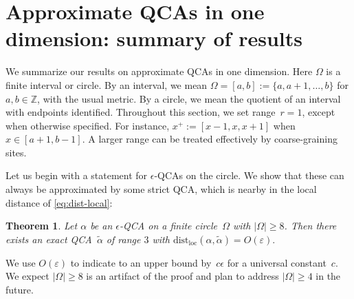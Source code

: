 \documentclass[11pt,reqno]{amsart}
\newtheorem{theorem}{Theorem}[section]
\theoremstyle{definition}
\theoremstyle{remark}
\numberwithin{equation}{section}
\DeclareMathOperator{\id}{id}
\newcommand{\eps}{\varepsilon}
\newcommand{\cA}{\mathcal A}
\newcommand{\distloc}{\mathrm{dist}_\mathrm{loc}}
\begin{document}

\section{Approximate QCAs in one dimension: summary of results}\label{sec:summary of results}
We summarize our results on approximate QCAs in one dimension.
Here $\Omega$ is a finite interval or circle.
By an interval, we mean $\Omega = [a,b] := \{a,a+1,\ldots,b\}$ for $a,b \in \mathbb{Z}$, with the usual metric.
By a circle, we mean the quotient of an interval with endpoints identified.
Throughout this section, we set range~$r=1$, except when otherwise specified.
For instance, $x^+ := [x-1,x,x+1]$ when $x \in [a+1,b-1]$.
A larger range can be treated effectively by coarse-graining sites.

Let us begin with a statement for $\epsilon$-QCAs on the circle.
We show that these can always be approximated by some strict QCA, which is nearby in the local distance of \cref{eq:dist-local}:

\begin{theorem}\label{thm:circle-round}
Let $\alpha$ be an $\epsilon$-QCA on a finite circle~$\Omega$ with $|\Omega| \ge 8$.
Then there exists an exact QCA~$\tilde{\alpha}$ of range $3$ with $\distloc(\alpha,\tilde \alpha) = O(\eps).$
\end{theorem}
\noindent
We use $O(\eps)$ to indicate to an upper bound by~$c \epsilon$ for a universal constant~$c$.  We expect $|\Omega| \ge 8$ is an artifact of the proof and plan to address $|\Omega| \ge 4$ in the future.
\end{document}
